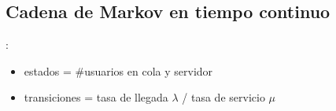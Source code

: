 \documentclass[xcolor={x11names}]{beamer}
\newtheorem{definicion}{Definición}[section]
\begin{document}
\subsection{Cadena de Markov en tiempo continuo}

\begin{frame}{\secname: \subsecname}
    \begin{figure}
        
    \end{figure}

    \begin{figure}
        
    \end{figure}


    \vfill

    \begin{itemize}
        \item estados = \#usuarios en
            cola y servidor
        \item transiciones =
            tasa de llegada $\lambda$ /
            tasa de servicio $\mu$
    \end{itemize}
\end{frame}








\end{document}
